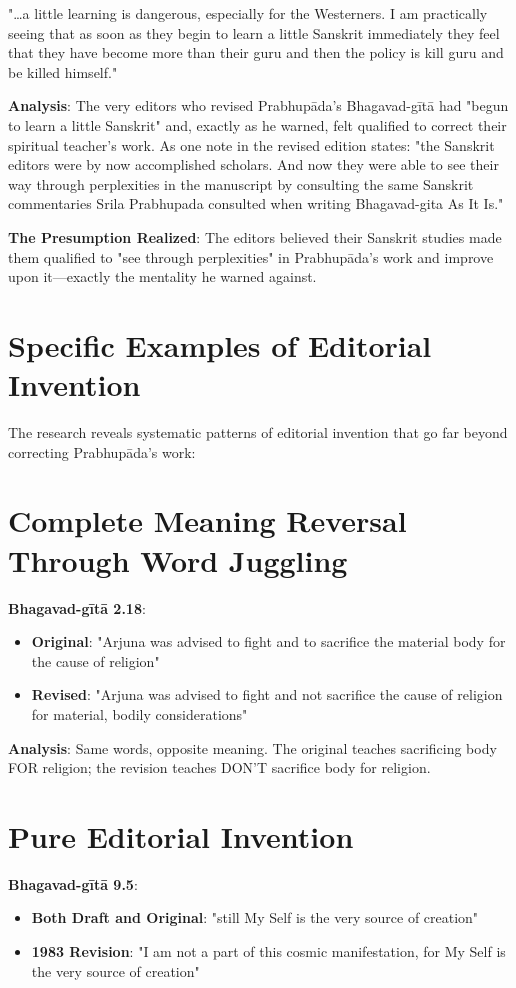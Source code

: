 \documentclass[11pt,twoside]{book}
\begin{document}
"\ldots{}a little learning is dangerous, especially for the Westerners. I am practically seeing that as soon as they begin to learn a little Sanskrit immediately they feel that they have become more than their guru and then the policy is kill guru and be killed himself."

\textbf{\textbf{Analysis}}: The very editors who revised Prabhupāda's Bhagavad-gītā had "begun to learn a little Sanskrit" and, exactly as he warned, felt qualified to correct their spiritual teacher's work. As one note in the revised edition states: "the Sanskrit editors were by now accomplished scholars. And now they were able to see their way through perplexities in the manuscript by consulting the same Sanskrit commentaries Srila Prabhupada consulted when writing Bhagavad-gita As It Is."

\textbf{\textbf{The Presumption Realized}}: The editors believed their Sanskrit studies made them qualified to "see through perplexities" in Prabhupāda's work and improve upon it—exactly the mentality he warned against.
\section*{Specific Examples of Editorial Invention}
\label{sec:orgc0dfca2}

The research reveals systematic patterns of editorial invention that go far beyond correcting Prabhupāda's work:
\section*{Complete Meaning Reversal Through Word Juggling}
\label{sec:orga341d0f}
\textbf{\textbf{Bhagavad-gītā 2.18}}:
\begin{itemize}
\item \textbf{\textbf{Original}}: "Arjuna was advised to fight and to sacrifice the material body for the cause of religion"
\item \textbf{\textbf{Revised}}: "Arjuna was advised to fight and not sacrifice the cause of religion for material, bodily considerations"
\end{itemize}

\textbf{\textbf{Analysis}}: Same words, opposite meaning. The original teaches sacrificing body FOR religion; the revision teaches DON'T sacrifice body for religion.
\section*{Pure Editorial Invention}
\label{sec:org1c91742}
\textbf{\textbf{Bhagavad-gītā 9.5}}:
\begin{itemize}
\item \textbf{\textbf{Both Draft and Original}}: "still My Self is the very source of creation"
\item \textbf{\textbf{1983 Revision}}: "I am not a part of this cosmic manifestation, for My Self is the very source of creation"
\end{itemize}
\end{document}
